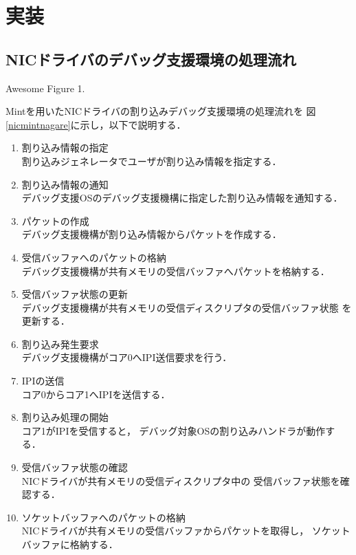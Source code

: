 \documentclass[tanilab-enum]{graduate}
\begin{document}
\chapter{実装}\label{chap:implementation}
\section{NICドライバのデバッグ支援環境の処理流れ}
{Awesome Figure 1.}

Mintを用いたNICドライバの割り込みデバッグ支援環境の処理流れを
図\ref{nicmintnagare}に示し，以下で説明する．
\begin{enumerate}
    \item 割り込み情報の指定\\
        割り込みジェネレータでユーザが割り込み情報を指定する．
    \item 割り込み情報の通知\\
        デバッグ支援OSのデバッグ支援機構に指定した割り込み情報を通知する．
    \item パケットの作成\\
        デバッグ支援機構が割り込み情報からパケットを作成する．
    \item 受信バッファへのパケットの格納\\
        デバッグ支援機構が共有メモリの受信バッファへパケットを格納する．
    \item 受信バッファ状態の更新\\
        デバッグ支援機構が共有メモリの受信ディスクリプタの受信バッファ状態
        を更新する．
    \item 割り込み発生要求\\
        デバッグ支援機構がコア0へIPI送信要求を行う．
    \item IPIの送信\\
        コア0からコア1へIPIを送信する．
    \item 割り込み処理の開始\\
        コア1がIPIを受信すると，
        デバッグ対象OSの割り込みハンドラが動作する．
    \item 受信バッファ状態の確認\\
        NICドライバが共有メモリの受信ディスクリプタ中の
        受信バッファ状態を確認する．
    \item ソケットバッファへのパケットの格納\\
        NICドライバが共有メモリの受信バッファからパケットを取得し，
        ソケットバッファに格納する．
\end{enumerate}
\end{document}
